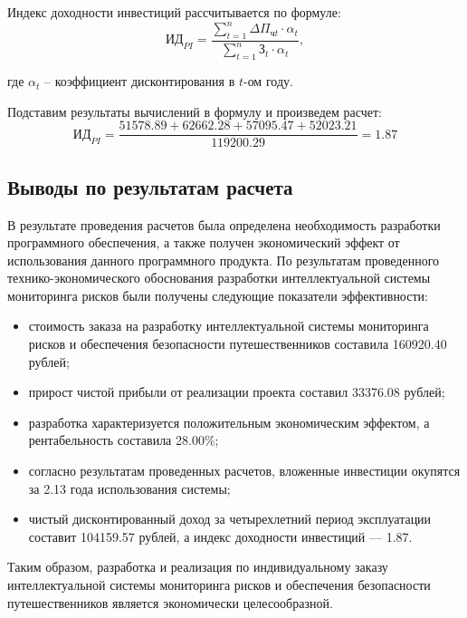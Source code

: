 Индекс доходности инвестиций рассчитывается по формуле:
\begin{equation}
    \text{ИД}_{PI} = \frac{\sum_{t=1}^{n}\Delta\Pi_{\text{ч}t}\cdot\alpha_{t}}{\sum_{t=1}^{n}\text{З}_{t}\cdot\alpha_{t}},
\end{equation}

где $\alpha_{t}$ -- коэффициент дисконтирования в $t$-ом году.

Подставим результаты вычислений в формулу и произведем расчет:
$$
    \text{ИД}_{PI} = \frac{51578.89 + 62662.28 + 57095.47 + 52023.21}{119200.29} = 1.87
$$
\subsection{Выводы по результатам расчета}

В результате проведения расчетов была определена необходимость разработки программного обеспечения, а также получен экономический эффект от использования данного программного продукта. По результатам проведенного технико-экономического обоснования разработки интеллектуальной системы мониторинга рисков были получены следующие показатели эффективности:

\begin{itemize}
    \item стоимость заказа на разработку интеллектуальной системы мониторинга рисков и обеспечения безопасности путешественников составила 160920.40 рублей;

    \item прирост чистой прибыли от реализации проекта составил 33376.08 рублей;

    \item разработка характеризуется положительным экономическим эффектом, а рентабельность составила 28.00\%;

    \item согласно результатам проведенных расчетов, вложенные инвестиции окупятся за 2.13 года использования системы;

    \item чистый дисконтированный доход за четырехлетний период эксплуатации составит 104159.57 рублей, а индекс доходности инвестиций — 1.87.
\end{itemize}

Таким образом, разработка и реализация по индивидуальному заказу интеллектуальной системы мониторинга рисков и обеспечения безопасности путешественников является экономически целесообразной.
